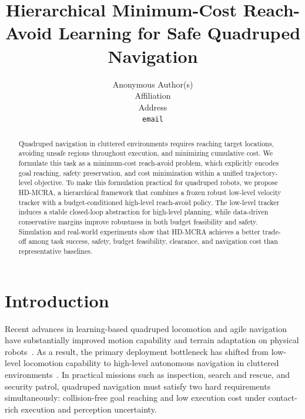 \documentclass{article}
\title{Hierarchical Minimum-Cost Reach-Avoid Learning for Safe Quadruped Navigation}
\author{
  Anonymous Author(s)\\
  Affiliation\\
  Address\\
  \texttt{email}
}
\begin{document}
\maketitle

\begin{abstract}
Quadruped navigation in cluttered environments requires reaching target locations, avoiding unsafe regions throughout execution, and minimizing cumulative cost. We formulate this task as a minimum-cost reach-avoid problem, which explicitly encodes goal reaching, safety preservation, and cost minimization within a unified trajectory-level objective. To make this formulation practical for quadruped robots, we propose HD-MCRA, a hierarchical framework that combines a frozen robust low-level velocity tracker with a budget-conditioned high-level reach-avoid policy. The low-level tracker induces a stable closed-loop abstraction for high-level planning, while data-driven conservative margins improve robustness in both budget feasibility and safety. Simulation and real-world experiments show that HD-MCRA achieves a better trade-off among task success, safety, budget feasibility, clearance, and navigation cost than representative baselines.
\end{abstract}


\section{Introduction}

Recent advances in learning-based quadruped locomotion and agile navigation have substantially improved motion capability and terrain adaptation on physical robots~\citep{hwangbo2019,lee2020,kumar2021,miki2022,hoeller2024,cheng2024}. As a result, the primary deployment bottleneck has shifted from low-level locomotion capability to high-level autonomous navigation in cluttered environments~\citep{chen2026,zhang2024,elnoor2024}. In practical missions such as inspection, search and rescue, and security patrol, quadruped navigation must satisfy two hard requirements simultaneously: collision-free goal reaching and low execution cost under contact-rich execution and perception uncertainty.
\end{document}
